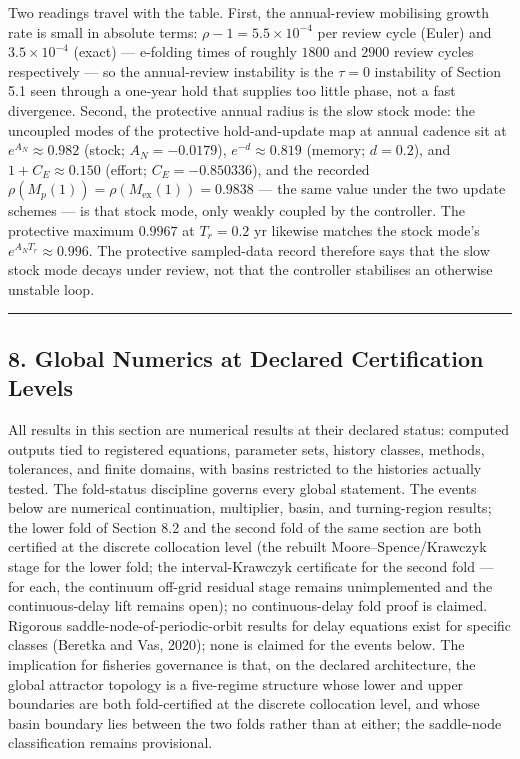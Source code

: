 \documentclass[11pt]{article}
\begin{document}
Two readings travel with the table. First, the annual-review mobilising
growth rate is small in absolute terms: \(\rho - 1 = 5.5\times10^{-4}\)
per review cycle (Euler) and \(3.5\times10^{-4}\) (exact) --- e-folding
times of roughly \(1800\) and \(2900\) review cycles respectively --- so
the annual-review instability is the \(\tau = 0\) instability of Section
5.1 seen through a one-year hold that supplies too little phase, not a
fast divergence. Second, the protective annual radius is the slow stock
mode: the uncoupled modes of the protective hold-and-update map at
annual cadence sit at \(e^{A_N} \approx 0.982\) (stock;
\(A_N = -0.0179\)), \(e^{-d} \approx 0.819\) (memory; \(d = 0.2\)), and
\(1 + C_E \approx 0.150\) (effort; \(C_E = -0.850336\)), and the
recorded \(\rho(M_p(1)) = \rho(M_{\mathrm{ex}}(1)) = 0.9838\) --- the
same value under the two update schemes --- is that stock mode, only
weakly coupled by the controller. The protective maximum \(0.9967\) at
\(T_r = 0.2\) yr likewise matches the stock mode's
\(e^{A_N T_r} \approx 0.996\). The protective sampled-data record
therefore says that the slow stock mode decays under review, not that
the controller stabilises an otherwise unstable loop.

\begin{center}\rule{0.5\linewidth}{0.5pt}\end{center}

\subsection{8. Global Numerics at Declared Certification
Levels}\label{global-numerics-at-declared-certification-levels}

All results in this section are numerical results at their declared
status: computed outputs tied to registered equations, parameter sets,
history classes, methods, tolerances, and finite domains, with basins
restricted to the histories actually tested. The fold-status discipline
governs every global statement. The events below are numerical
continuation, multiplier, basin, and turning-region results; the lower
fold of Section 8.2 and the second fold of the same section are both
certified at the discrete collocation level (the rebuilt
Moore--Spence/Krawczyk stage for the lower fold; the interval-Krawczyk
certificate for the second fold --- for each, the continuum off-grid
residual stage remains unimplemented and the continuous-delay lift
remains open); no continuous-delay fold proof is claimed. Rigorous
saddle-node-of-periodic-orbit results for delay equations exist for
specific classes (Beretka and Vas, 2020); none is claimed for the events
below. The implication for fisheries governance is that, on the declared
architecture, the global attractor topology is a five-regime structure
whose lower and upper boundaries are both fold-certified at the discrete
collocation level, and whose basin boundary lies between the two folds
rather than at either; the saddle-node classification remains
provisional.
\end{document}
